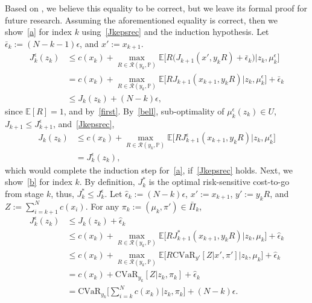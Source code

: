 \documentclass[letterpaper, 10 pt, conference]{ieeeconf}  %
\begin{document}
Based on \cite{chow2015risk}, we believe this equality to be correct, but we leave its formal proof for future research. 
Assuming the aforementioned equality is correct, then we show~\eqref{a} for index $k$ using~\eqref{Jkepsrec} and the induction hypothesis. 
Let $\bar{\epsilon}_k := (N-k-1)\epsilon$, and $x' := x_{k+1}$.
%
\begin{equation*}\begin{aligned}
J_k^\epsilon(z_k) & \leq c(x_k) + {\underset{R \in \mathcal{R}(y_k, \mathbb{P})}\max} \mathbb{E}\big[ R\big(J_{k+1}(x',y_k R) + \bar{\epsilon}_k\big) \big| z_k, \mu_k^\epsilon \big]\\
& = c(x_k) + {\underset{R \in \mathcal{R}(y_k, \mathbb{P})}\max} \mathbb{E}\big[ R J_{k+1}(x_{k+1},y_k R) \big| z_k, \mu_k^\epsilon \big] + \bar{\epsilon}_k\\ 
& \leq J_k(z_k) + (N-k)\epsilon,
\end{aligned}\end{equation*}
%
since $\mathbb{E}[R] = 1$, and by~\eqref{first}. By~\eqref{bell}, sub-optimality of $\mu_k^\epsilon(z_k) \in U$, $J_{k+1} \leq J^\epsilon_{k+1}$, and~\eqref{Jkepsrec},
%
\begin{equation*}\begin{aligned}
J_k(z_k) & \leq c(x_k) + {\underset{R \in \mathcal{R}(y_k, \mathbb{P})}\max} \mathbb{E}\big[ R J^\epsilon_{k+1}(x_{k+1},y_k R) \big| z_k, \mu_k^\epsilon \big]\\
& = J_k^\epsilon(z_k), \end{aligned}\end{equation*}
%
which would complete the induction step for~\eqref{a}, if~\eqref{Jkepsrec} holds.
Next, we show~\eqref{b} for index $k$. By definition, $J_k^*$ is the optimal risk-sensitive cost-to-go from stage $k$, thus, $J_k^* \leq J_k^\epsilon$.
Let $\hat{\epsilon}_k := (N-k)\epsilon$, $x':=x_{k+1}$, $y' := y_kR$, and $Z := \sum_{i=k+1}^N c(x_i)$. For any $\pi_k := (\mu_k, \pi') \in \bar{\Pi}_k$,
%
\begin{equation*}\begin{aligned}
J_k^\epsilon(z_k) & \leq J_k(z_k) + \hat{\epsilon}_k \\
& \leq c(x_k) + {\underset{R \in \mathcal{R}(y_k, \mathbb{P})}\max} \mathbb{E}\big[ RJ_{k+1}^*(x_{k+1},y_kR) \big| z_k, \mu_k \big] + \hat{\epsilon}_k\\
& \leq c(x_k) + {\underset{R \in \mathcal{R}(y_k, \mathbb{P})}\max} \mathbb{E}\big[ R\text{CVaR}_{y'} [Z|x', \pi' ] \big| z_k, \mu_k \big] + \hat{\epsilon}_k\\
& = c(x_k) + \text{CVaR}_{y_k}[Z|z_k, \pi_k] + \hat{\epsilon}_k\\
& = \text{CVaR}_{y_k}\big[\textstyle \sum_{i=k}^N c(x_k)|z_k, \pi_k\big] + (N-k)\epsilon.
\end{aligned}\end{equation*}
\end{document}
